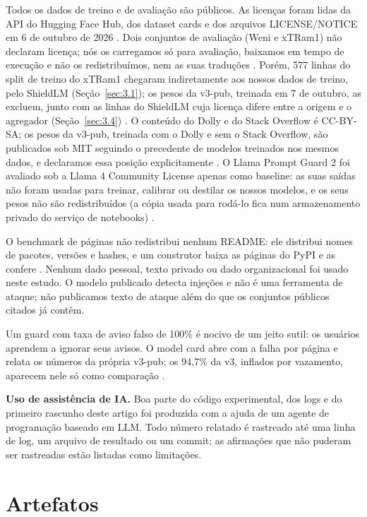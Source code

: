 \documentclass[11pt]{article}
\begin{document}
Todos os dados de treino e de avaliação são públicos. As licenças foram lidas da API do Hugging Face Hub, dos dataset cards e dos arquivos LICENSE/NOTICE em 6 de outubro de 2026%
. Dois conjuntos de avaliação (Weni e xTRam1) não declaram licença; nós os carregamos só para avaliação, baixamos em tempo de execução e não os redistribuímos, nem as suas traduções%
. Porém, 577 linhas do split de treino do xTRam1 chegaram indiretamente aos nossos dados de treino, pelo ShieldLM (Seção~\ref{sec:3.1}); os pesos da v3-pub, treinada em 7 de outubro, as excluem, junto com as linhas do ShieldLM cuja licença difere entre a origem e o agregador (Seção~\ref{sec:3.4})%
. O conteúdo do Dolly e do Stack Overflow é CC-BY-SA; os pesos da v3-pub, treinada com o Dolly e sem o Stack Overflow, são publicados sob MIT seguindo o precedente de modelos treinados nos mesmos dados, e declaramos essa posição explicitamente%
. O Llama Prompt Guard 2 foi avaliado sob a Llama 4 Community License apenas como baseline: as suas saídas não foram usadas para treinar, calibrar ou destilar os nossos modelos, e os seus pesos não são redistribuídos (a cópia usada para rodá-lo fica num armazenamento privado do serviço de notebooks)%
.

O benchmark de páginas não redistribui nenhum README: ele distribui nomes de pacotes, versões e hashes, e um construtor baixa as páginas do PyPI e as confere%
. Nenhum dado pessoal, texto privado ou dado organizacional foi usado neste estudo. O modelo publicado detecta injeções e não é uma ferramenta de ataque; não publicamos texto de ataque além do que os conjuntos públicos citados já contêm.

Um guard com taxa de aviso falso de 100\% é nocivo de um jeito sutil: os usuários aprendem a ignorar seus avisos. O model card abre com a falha por página e relata os números da própria v3-pub; os 94,7\% da v3, inflados por vazamento, aparecem nele só como comparação%
.

\textbf{Uso de assistência de IA.} Boa parte do código experimental, dos logs e do primeiro rascunho deste artigo foi produzida com a ajuda de um agente de programação baseado em LLM. Todo número relatado é rastreado até uma linha de log, um arquivo de resultado ou um commit; as afirmações que não puderam ser rastreadas estão listadas como limitações. %

\section{Artefatos}\label{sec:13}
\end{document}
